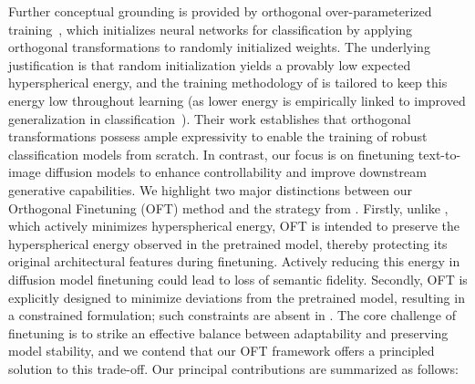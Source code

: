 Further conceptual grounding is provided by orthogonal over-parameterized training~\cite{liu2021orthogonal}, which initializes neural networks for classification by applying orthogonal transformations to randomly initialized weights. The underlying justification is that random initialization yields a provably low expected hyperspherical energy, and the training methodology of \cite{liu2021orthogonal} is tailored to keep this energy low throughout learning (as lower energy is empirically linked to improved generalization in classification~\cite{liu2018learning,lin2020regularizing}). Their work establishes that orthogonal transformations possess ample expressivity to enable the training of robust classification models from scratch. In contrast, our focus is on finetuning text-to-image diffusion models to enhance controllability and improve downstream generative capabilities. We highlight two major distinctions between our Orthogonal Finetuning (OFT) method and the strategy from \cite{liu2021orthogonal}. Firstly, unlike \cite{liu2021orthogonal}, which actively minimizes hyperspherical energy, OFT is intended to preserve the hyperspherical energy observed in the pretrained model, thereby protecting its original architectural features during finetuning. Actively reducing this energy in diffusion model finetuning could lead to loss of semantic fidelity. Secondly, OFT is explicitly designed to minimize deviations from the pretrained model, resulting in a constrained formulation; such constraints are absent in \cite{liu2021orthogonal}. The core challenge of finetuning is to strike an effective balance between adaptability and preserving model stability, and we contend that our OFT framework offers a principled solution to this trade-off. Our principal contributions are summarized as follows:

